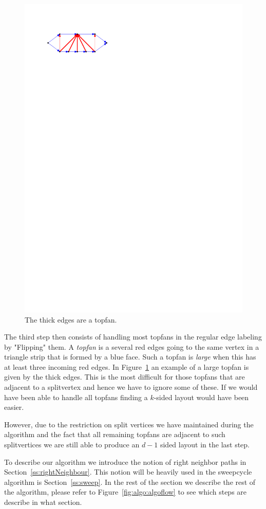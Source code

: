   \begin{figure} %
    \centering
    \includegraphics[]{unifiedAlgo/img/topfanExample.pdf}
    \caption{The thick edges are a topfan.}
    \label{fig:algo:topfanExample}
  \end{figure}

  The third step then consists of handling most topfans in the regular edge labeling by "Flipping" them.
  A \emph{topfan} is a several red edges going to the same vertex in a triangle strip that is formed by a blue face. Such a topfan is \emph{large} when this has at least three incoming red edges. In Figure~\ref{fig:algo:topfanExample} an example of a large topfan is given by the thick edges.
  This is the most difficult for those topfans that are adjacent to a splitvertex and hence we have to ignore some of these. If we would have been able to handle all topfans finding a $k$-sided layout would have been easier.

  However, due to the restriction on split vertices we have maintained during the algorithm and the fact that all remaining topfans are adjacent to such splitvertices we are still able to produce an $d-1$ sided layout in the last step.

  To describe our algorithm we introduce the notion of right neighbor paths in Section~\ref{ss:rightNeighbour}. This notion will be heavily used in the sweepcycle algorithm is Section~\ref{ss:sweep}. In the rest of the section we describe the rest of the algorithm, please refer to Figure~\ref{fig:algo:algoflow} to see which steps are describe in what section.
